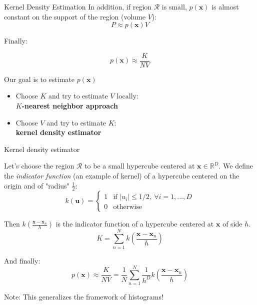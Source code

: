 \documentclass{beamer}
\begin{document}
\begin{frame}{Kernel Density Estimation}
In addition, if region $\mathcal{R}$ is small, $p(\mathbf{x})$ is almost constant on the support of the region (volume $V$):
\begin{equation*}
P \approx p(\mathbf{x})V
\end{equation*}

Finally:

\begin{equation*}
p(\mathbf{x}) \approx \frac{K}{NV}
\end{equation*}

Our goal is to estimate $p(\mathbf{x})$

\begin{itemize}
\item Choose $K$ and try to estimate $V$ locally:\\ \textbf{$K$-nearest neighbor approach}
\item Choose $V$ and try to estimate $K$:\\ \textbf{kernel density estimator}
\end{itemize}
\end{frame}

\begin{frame}{Kernel density estimator}

Let's choose the region $\mathcal{R}$ to be a small hypercube centered at $\mathbf{x}\in \mathbb{R}^{D}$.
We define the \emph{indicator function} (an example of kernel) of a hypercube centered on the origin and of "radius" $\frac{1}{2}$:
\begin{equation*}
k(\mathbf{u}) = \begin{cases}
    1& \text{if } |u_{i}|\leq 1/2, \ \forall i=1,...,D\\
    0             & \text{otherwise}
\end{cases}
\end{equation*}

Then $k(\frac{\mathbf{x}-\mathbf{x}_{n}}{h})$ is the indicator function of a hypercube centered at $\mathbf{x}$ of side $h$.
\begin{equation*}
K = \sum_{n=1}^{N} k\left(\frac{\mathbf{x}-\mathbf{x}_{n}}{h}\right)
\end{equation*}

And finally:
\begin{equation*}
p(\mathbf{x}) \approx \frac{K}{NV} = \frac{1}{N}\sum_{n=1}^{N} \frac{1}{h^{D}} k\left(\frac{\mathbf{x}-\mathbf{x}_{n}}{h}\right)
\end{equation*}

Note: This generalizes the framework of histograms!

\end{frame}
\end{document}
